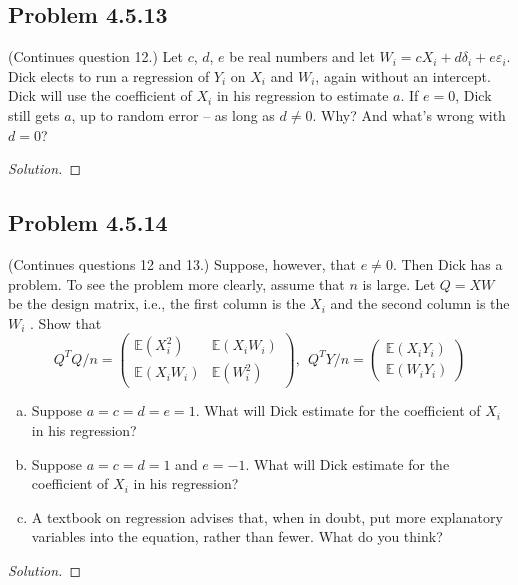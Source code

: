 \documentclass{amsart}\usepackage[]{graphicx}\usepackage[]{color}
\newcommand{\ep}{\varepsilon}
\begin{document}
		\subsection*{Problem 4.5.13} %
		\label{ssub:problem_4_5_13}
			(Continues question 12.)
			Let $c$, $d$, $e$ be real numbers and let $W_{i} = cX_{i} + d\delta_{i} + e\ep_{i}$.
			Dick elects to run a regression of $Y_{i}$ on $X_{i}$ and $W_{i}$, again without an intercept.
			Dick will use the coefficient of $X_{i}$ in his regression to estimate $a$.
			If $e = 0$, Dick still gets $a$, up to random error -- as long as $d \neq 0$.
			Why?
			And what’s wrong with $d = 0$?
			\begin{proof}[Solution]
			\end{proof}
		\subsection*{Problem 4.5.14} %
		\label{ssub:problem_4_5_14}
			(Continues questions 12 and 13.)
			Suppose, however, that $e \neq 0$.
			Then Dick has a problem.
			To see the problem more clearly, assume that $n$ is large.
			Let $Q =  X W$  be the design matrix, i.e., the first column is the $X_{i}$ and the second column is the $W_{i}$ .
			Show that $$Q^{T}Q/n = \begin{pmatrix}
				\mathbb{E}(X_{i}^{2}) & \mathbb{E}(X_{i}W_{i}) \\
				\mathbb{E}(X_{i}W_{i}) & \mathbb{E}(W_{i}^{2})
			\end{pmatrix}, \ \ Q^{T}Y/n = \begin{pmatrix}
				\mathbb{E}(X_{i}Y_{i}) \\
				\mathbb{E}(W_{i}Y_{i})
			\end{pmatrix}$$
			\begin{enumerate}[(a)]
				\item Suppose $a = c = d = e = 1$.
				What will Dick estimate for the coefficient of $X_{i}$ in his regression?
				\item Suppose $a = c = d = 1$ and $e = -1$.
				What will Dick estimate for the coefficient of $X_{i}$ in his regression?
				\item  A textbook on regression advises that, when in doubt, put more explanatory variables into the equation, rather than fewer.
				What do you think?
			\end{enumerate}
			\begin{proof}[Solution]
			\end{proof}
\end{document}
